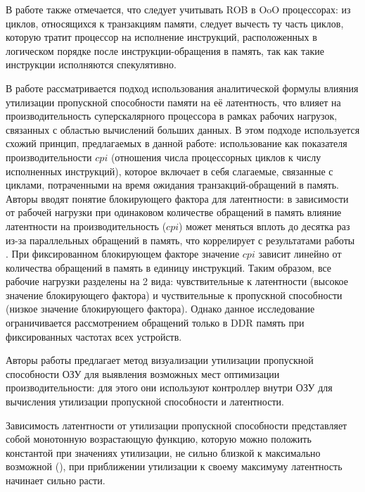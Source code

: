     В работе также отмечается, что следует учитывать ROB в OoO процессорах: из циклов, относящихся к
    транзакциям памяти, следует вычесть ту часть циклов, которую тратит процессор на исполнение
    инструкций, расположенных в логическом порядке после инструкции-обращения в память,
    так как такие инструкции исполняются спекулятивно.

    В работе \cite{clapp2015quantifying} рассматривается подход использования аналитической
    формулы влияния утилизации пропускной способности памяти на её латентность, что влияет
    на производительность суперскалярного процессора в рамках рабочих нагрузок,
    связанных с областью вычислений больших данных.
    В этом подходе используется схожий принцип, предлагаемых в данной работе: использование как
    показателя производительности $cpi$ (отношения числа процессорных циклов к числу исполненных
    инструкций), которое включает в себя слагаемые, связанные с циклами, потраченными
    на время ожидания транзакций-обращений в память. Авторы вводят понятие блокирующего фактора
    для латентности: в зависимости от рабочей нагрузки при одинаковом количестве обращений в память
    влияние латентности на производительность ($cpi$) может меняться вплоть до десятка раз из-за
    параллельных обращений в память, что коррелирует с результатами работы \cite{keramidas2010interval}.
    При фиксированном блокирующем факторе значение $cpi$ зависит линейно от количества обращений
    в память в единицу инструкций.
    Таким образом, все рабочие нагрузки разделены на 2 вида: чувствительные к латентности (высокое
    значение блокирующего фактора) и чуствительные к пропускной способности (низкое значение
    блокирующего фактора).
    Однако данное исследование ограничивается
    рассмотрением обращений только в DDR память при фиксированных частотах всех устройств.

    Авторы работы \cite{eyerman2022dram} предлагает метод визуализации утилизации пропускной способности
    ОЗУ для выявления возможных мест оптимизации производительности: для этого они используют
    контроллер внутри ОЗУ для вычисления утилизации пропускной способности и латентности.

    Зависимость латентности от утилизации пропускной способности представляет собой монотонную
    возрастающую функцию, которую можно положить константой при значениях утилизации, не сильно близкой
    к максимально возможной (\cite{david2011memory}), при приближении утилизации к своему максимуму
    латентность начинает сильно расти.

